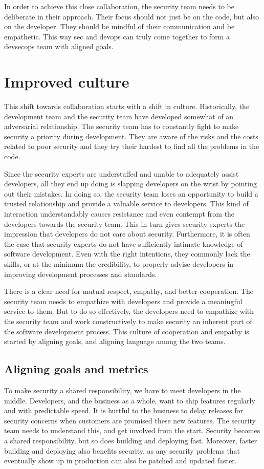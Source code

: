 In order to achieve this close collaboration, the security team needs to be deliberate in their approach. Their focus should not just be on the code, but also on the developer.
They should be mindful of their communication and be empathetic. This way \gls{sec} and \gls{devops} can truly come together to form a \gls{devsecops} team with aligned goals.

\section{Improved culture}
This shift towards collaboration starts with a shift in culture.
Historically, the development team and the security team have developed somewhat of an adversarial relationship.
The security team has to constantly fight to make security a priority during development.
They are aware of the risks and the costs related to poor security and they try their hardest to find all the problems in the code.

Since the security experts are understaffed and unable to adequately assist developers, all they end up doing is slapping developers on the wrist by pointing out their mistakes.
In doing so, the security team loses an opportunity to build a trusted relationship and provide a valuable service to developers.
This kind of interaction understandably causes resistance and even contempt from the developers towards the security team.
This in turn gives security experts the impression that developers do not care about security.
Furthermore, it is often the case that security experts do not have sufficiently intimate knowledge of software development.
Even with the right intentions, they commonly lack the skills, or at the minimum the credibility, to properly advise developers in improving development processes and standards.

There is a clear need for mutual respect, empathy, and better cooperation.
The security team needs to empathize with developers and provide a meaningful service to them.
But to do so effectively, the developers need to empathize with the security team and work constructively to make security an inherent part of the software development process. This culture of cooperation and empathy is started by aligning goals, and aligning language among the two teams.

\subsection{Aligning goals and metrics}
To make security a shared responsibility, we have to meet developers in the middle.
Developers, and the business as a whole, want to ship features regularly and with predictable speed.
It is hurtful to the business to delay releases for security concerns when customers are promised these new features.
The security team needs to understand this, and get involved from the start.
Security becomes a shared responsibility, but so does building and deploying fast.
Moreover, faster building and deploying also benefits security, as any security problems that eventually show up in production can also be patched and updated faster.

